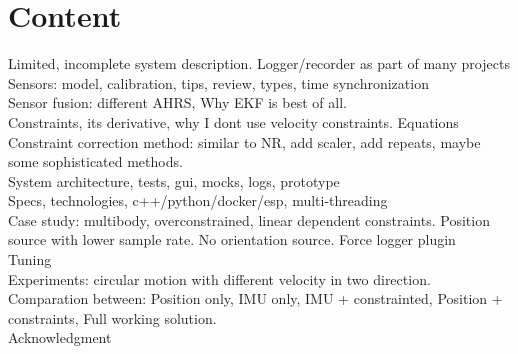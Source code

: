 \chapter{Content}

Limited, incomplete system description. Logger/recorder as part of many projects\\

Sensors: model, calibration, tips, review, types, time synchronization\\

Sensor fusion: different AHRS, Why EKF is best of all.\\

Constraints, its derivative, why I dont use velocity constraints. Equations\\

Constraint correction method: similar to NR, add scaler, add repeats, maybe some sophisticated methods.\\

System architecture, tests, gui, mocks, logs, prototype\\
Specs, technologies, c++/python/docker/esp, multi-threading\\

Case study: multibody, overconstrained, linear dependent constraints. Position source with lower sample rate. No orientation source. Force logger plugin\\

Tuning\\

Experiments: circular motion with different velocity in two direction. Comparation between:
Position only, IMU only, IMU + constrainted, Position + constraints, Full working solution.\\

Acknowledgment




